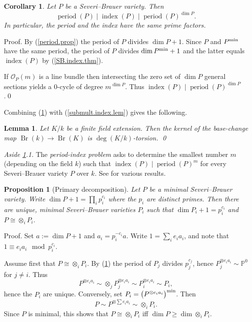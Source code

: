 \documentclass{amsart}
\newtheorem{lem}[thm]{Lemma}
\newtheorem{cor}[thm]{Corollary}
\newtheorem{prop}[thm]{Proposition}
\theoremstyle{definition}
\theoremstyle{remark}
\renewcommand{\o}[0]{{\mathcal O}}
\newcommand{\p}[0]{{\mathbb P}}
\newcommand{\br}[0]{\operatorname{Br}}
\newcommand{\tsum}[0]{\textstyle{\sum}}
\newcommand{\ind}[0]{\operatorname{index}}
\begin{document}
\begin{cor}\label{period.prop.cor} Let $P$ be  a Severi--Brauer variety. Then
$$
\operatorname{period}(P)\mid \ind(P)\mid 
\operatorname{period}(P)^{\dim P}.
$$
In particular, the period and the index have the same prime factors.
\end{cor}

Proof. By (\ref{period.prop}) the period of $P$ divides $\dim P+1$. 
Since $P$ and $P^{\rm min}$  have the same period, 
the period of $P$ divides $\dim P^{\rm min}+1$ and the latter equals
$\ind(P)$ by (\ref{SB.index.thm}).


If $\o_P(m)$ is a line bundle then intersecting the zero set of $\dim P$
general sections yields a 0-cycle of degree $m^{\dim P}$. 
Thus $\ind(P)\mid \operatorname{period}(P)^{\dim P}$.\qed
\medskip


Combining (\ref{period.prop.cor}) with (\ref{submult.index.lem})  gives the following.

\begin{lem}\label{rel.br.dp.lem} Let  $K/k$ be a finite field extension. Then
the kernel of the base-change map  $\br(k)\to \br(K)$ is
$\deg (K/k)$-torsion. \qed
\end{lem}


{\it Aside  \ref{rel.br.dp.lem}.1.} The {\it period-index problem} asks to determine the smallest
number $m$ (depending on the field $k$) such that
$\ind(P)\mid \operatorname{period}(P)^m$
for every Severi--Brauer variety $P$ over $k$. 
See \cite{MR2060023, MR2745688, MR3418522} for various results. 




\begin{prop}[Primary decomposition]  Let $P$ be a minimal 
Severi--Brauer variety. Write $\dim P+1=\prod_i p_i^{c_i}$ where the  $p_i$
are distinct primes. Then there are unique, minimal  Severi--Brauer varieties
$P_i$ such that  $\dim P_i+1= p_i^{c_i}$ and 
$P\cong \otimes_i P_i$.
\end{prop}


Proof. Set $a:=\dim P+1$ and $a_i=p_i^{-c_i}a$. Write  $1=\tsum_i e_ia_i$,
and note that $1\equiv  e_ia_i \mod p_i^{c_i}$.

Assume first that  $P\cong \otimes_i P_i$. By (\ref{period.prop.cor})
 the  period of $P_j$ divides $p_j^{c_j}$, hence
$P_j^{\otimes  e_ia_i}\sim \p^0$ for $j\neq i$. Thus
$$
 P^{\otimes e_{i}a_{i}}\sim \otimes_j P_j^{\otimes  e_ia_i}\sim 
P_i^{\otimes  e_ia_i}\sim P_i,
$$
hence the $P_i$ are unique. Conversely, set  
$P_i=\bigl(P^{\otimes e_{i}a_{i}}\bigr)^{\rm min}$. Then 
$$
P\sim P^{\otimes \sum e_{i}a_{i}} \sim \otimes_i P_i.
$$
Since $P$ is minimal, this shows that
 $P\cong \otimes_i P_i$ iff $\dim P\geq \dim  \otimes_i P_i $.
\end{document}
